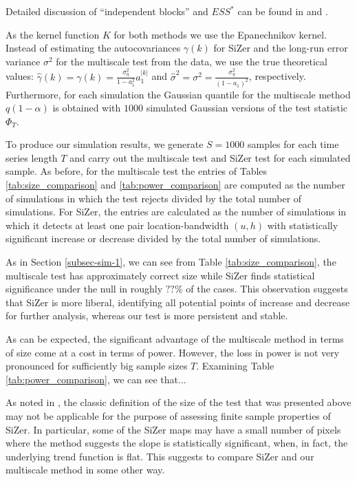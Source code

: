 \documentclass[a4paper,12pt]{article}
\begin{document}
Detailed discussion of ``independent blocks'' and $ESS^*$ can be found in \cite{ChaudhuriMarron1999} and \cite{Rondonotti2007}. 

As the kernel function $K$ for both methods  we use the Epanechnikov kernel. Instead of estimating the autocovariances $\gamma(k)$ for SiZer and the long-run error variance $\sigma^2$ for the multiscale test from the data, we use the true theoretical values: $\widehat{\gamma}(k) = \gamma(k) = \frac{\sigma_\eta^2}{1 - a_1^2}a_1^{|k|}$ and $\widehat{\sigma}^2 = \sigma^2 = \frac{\sigma_\eta^2}{(1 - a_1)^2}$, respectively. Furthermore, for each simulation the Gaussian quantile for the multiscale method  $q(1 - \alpha)$ is obtained with $1000$ simulated Gaussian versions of the test statistic $\Phi_T$.

To produce our simulation results, we generate $S=1000$ samples for each time series length $T$ and carry out the multiscale test and SiZer test for each simulated sample. As before, for the multiscale test the entries of Tables \ref{tab:size_comparison} and \ref{tab:power_comparison} are computed as the number of simulations in which the test rejects divided by the total number of simulations. For SiZer, the entries are calculated as the number of simulations in which it detects at least one pair location-bandwidth $(u,h)$ with statistically significant increase or decrease divided by the total number of simulations.

As in Section \ref{subsec-sim-1}, we can see from Table \ref{tab:size_comparison}, the multiscale test has approximately correct size while SiZer finds statistical significance under the null in roughly $??\%$ of the cases. This observation suggests that SiZer is more liberal, identifying all potential points of increase and decrease for further analysis, whereas our test is more persistent and stable.

As can be expected, the significant advantage of the multiscale method in terms of size come at a cost in terms of power. However, the loss in power is not very pronounced for sufficiently big sample sizes $T$. Examining Table \ref{tab:power_comparison}, we can see that...

As noted in \cite{HannigMarron2006}, the classic definition of the size of the test that was presented above may not be applicable for the purpose of assessing finite sample properties of SiZer. In particular, some of the SiZer maps may have a small number of pixels where the method suggests the slope is statistically significant, when, in fact, the underlying trend function is flat. This suggests to compare SiZer and our multiscale method in some other way.
\end{document}
